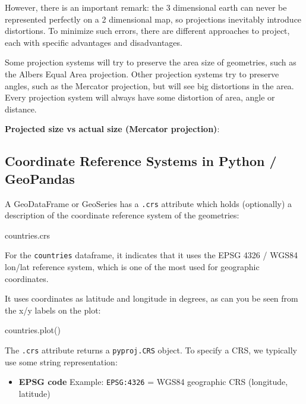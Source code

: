 \documentclass[
  letterpaper,
  DIV=11,
  numbers=noendperiod]{scrreprt}
\newenvironment{Shaded}{\begin{snugshade}}{\end{snugshade}}
\newcommand{\NormalTok}[1]{\textcolor[rgb]{0.00,0.23,0.31}{#1}}
\providecommand{\tightlist}{%
  \setlength{\itemsep}{0pt}\setlength{\parskip}{0pt}}\usepackage{longtable,booktabs,array}
\begin{document}
However, there is an important remark: the 3 dimensional earth can never
be represented perfectly on a 2 dimensional map, so projections
inevitably introduce distortions. To minimize such errors, there are
different approaches to project, each with specific advantages and
disadvantages.

Some projection systems will try to preserve the area size of
geometries, such as the Albers Equal Area projection. Other projection
systems try to preserve angles, such as the Mercator projection, but
will see big distortions in the area. Every projection system will
always have some distortion of area, angle or distance.

\textbf{Projected size vs actual size (Mercator projection)}:

\hypertarget{coordinate-reference-systems-in-python-geopandas}{%
\subsection{Coordinate Reference Systems in Python /
GeoPandas}\label{coordinate-reference-systems-in-python-geopandas}}

A GeoDataFrame or GeoSeries has a \texttt{.crs} attribute which holds
(optionally) a description of the coordinate reference system of the
geometries:

\begin{Shaded}
\begin{Highlighting}[]
\NormalTok{countries.crs}
\end{Highlighting}
\end{Shaded}

For the \texttt{countries} dataframe, it indicates that it uses the EPSG
4326 / WGS84 lon/lat reference system, which is one of the most used for
geographic coordinates.

It uses coordinates as latitude and longitude in degrees, as can you be
seen from the x/y labels on the plot:

\begin{Shaded}
\begin{Highlighting}[]
\NormalTok{countries.plot()}
\end{Highlighting}
\end{Shaded}

The \texttt{.crs} attribute returns a \texttt{pyproj.CRS} object. To
specify a CRS, we typically use some string representation:

\begin{itemize}
\tightlist
\item
  \textbf{EPSG code} Example: \texttt{EPSG:4326} = WGS84 geographic CRS
  (longitude, latitude)
\end{itemize}
\end{document}
